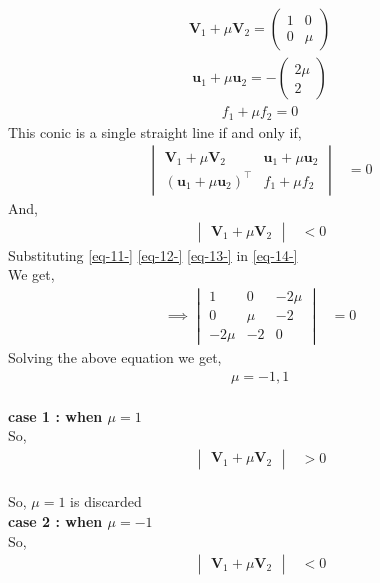 \documentclass[journal,12pt,twocolumn]{IEEEtran}
\newcommand{\myvec}[1]{\ensuremath{\begin{pmatrix}#1\end{pmatrix}}}
\let\vec\mathbf
\let\vec\mathbf
\newcommand{\mydet}[1]{\ensuremath{\begin{vmatrix}#1\end{vmatrix}}}
\providecommand{\brak}[1]{\ensuremath{\left(#1\right)}}
\begin{document}
\begin{align}
\vec{V}_1+\mu\vec{V}_2= \myvec{
1 & 0\\
0 & \mu
}
\label{eq-11-}  
\end{align}
\begin{align}
\vec{u}_1+\mu\vec{u}_2= -\myvec{
2 \mu\\
2
}
\label{eq-12-}  
\end{align}
\begin{align}
f_1+\mu f_2= 0
\label{eq-13-}  
\end{align}
This conic is a single straight line if and only if, \\ \vspace{1mm}
\begin{align}
\mydet{\vec{V}_1 + \mu\vec{V}_2 & \vec{u}_1+\mu \vec{u}_2\\ \brak{\vec{u}_1+\mu \vec{u}_2}^{\top} & f_1 + \mu f_2} &= 0
\label{eq-14-}  
\end{align}
And,\\
\begin{align}
\mydet{\vec{V}_1 + \mu\vec{V}_2} & < 0
\end{align}
Substituting \eqref{eq-11-} \eqref{eq-12-} \eqref{eq-13-} in \eqref{eq-14-}\\ \vspace{1mm}
We get,\\ \vspace{1mm}
\begin{align}
\implies \mydet{1& 0 & -2 \mu\\ 
0 & \mu & -2 \\
-2 \mu & -2 & 0
} &= 0
\end{align}
Solving the above equation we get,\\ 
\begin{align}
    \mu = -1 ,1
\end{align}
\\
\textbf{case 1 : when $\mu = 1$}\\
So,\\
\begin{align}
\mydet{\vec{V}_1 + \mu\vec{V}_2} & > 0
\end{align}
\\
So, $\mu =1 $ is discarded\\
\textbf{case 2 : when $\mu = -1$}\\
So,\\
\begin{align}
\mydet{\vec{V}_1 + \mu\vec{V}_2} & < 0
\end{align}
\end{document}
